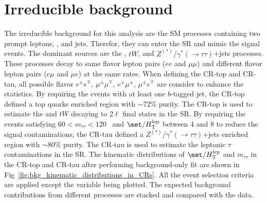 \section{Irreducible background}
\label{sec:bkg_irreducible_background}
The irreducible background for this analysis are the SM processes containing two prompt leptons, \met, and jets.
Therefor, they can enter the SR and mimic the signal events.
The dominant sources are the \ttbar, $tW$, and $Z^{(*)}/\gamma^{*}(\to \tau \tau)$+jets processes.
These processes decay to same flavor lepton pairs ($ee$ and $\mu \mu$) and different flavor lepton pairs ($e \mu$ and $\mu e$) at the same rates.
When defining the CR-top and CR-tau, all possible flavor $e^{\pm} e^{\mp}$, $\mu^{\pm} \mu^{\mp}$, $e^{\pm} \mu^{\pm}$, $\mu^{\pm} e^{\mp}$ are consider to enhance the statistics.
By requiring the events with at least one $b$-tagged jet, the CR-top defined a top quarks enriched region with $\sim$72\% purity.
The CR-top is used to estimate the \ttbar and $tW$ decaying to 2$\ell$ final states in the SR.
By requiring the events satisfying $60 < m_{\tau \tau} < 120$~{\GeV} and $\met/H_{\mathrm{T}}^{\mathrm{lep}}$ between 4 and 8 to reduce the signal contaminations, the CR-tau defined a $Z^{(*)}/\gamma^{*}(\to \tau \tau)$+jets enriched region with $\sim$80\% purity.
The CR-tau is used to estimate the leptonic $\tau$ contaminations in the SR.
The kinematic distributions of $\met/H_\mathrm{T}^\mathrm{lep}$ and $m_{\tau \tau}$ in the CR-top and CR-tau after performing background-only fit are shown in Fig~\ref{fig:bkg_kinematic_distributions_in_CRs}.
All the event selection criteria are applied except the variable being plotted.
The expected background contributions from different processes are stacked and compared with the data.


